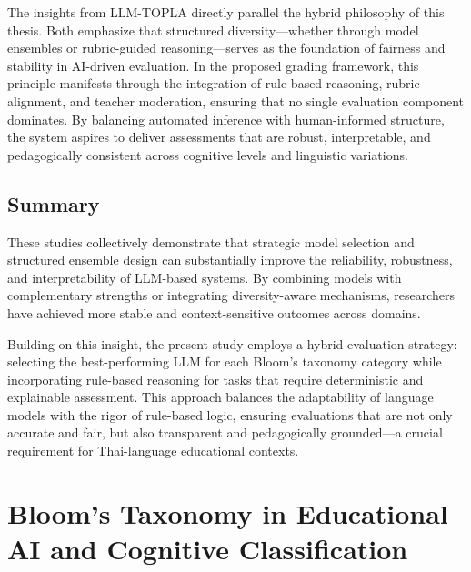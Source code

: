 The insights from LLM-TOPLA directly parallel the hybrid 
philosophy of this thesis. Both emphasize that structured 
diversity—whether through model ensembles or rubric-guided 
reasoning—serves as the foundation of fairness and stability 
in AI-driven evaluation. In the proposed grading framework, 
this principle manifests through the integration of rule-based 
reasoning, rubric alignment, and teacher moderation, ensuring 
that no single evaluation component dominates. By balancing 
automated inference with human-informed structure, the system 
aspires to deliver assessments that are robust, interpretable, 
and pedagogically consistent across cognitive levels and 
linguistic variations.


\subsection{Summary}

These studies collectively demonstrate that strategic model 
selection and structured ensemble design can substantially 
improve the reliability, robustness, and interpretability of 
LLM-based systems. By combining models with complementary 
strengths or integrating diversity-aware mechanisms, 
researchers have achieved more stable and context-sensitive 
outcomes across domains.

Building on this insight, the present study employs a hybrid 
evaluation strategy: selecting the best-performing LLM for 
each Bloom’s taxonomy category while incorporating rule-based 
reasoning for tasks that require deterministic and explainable 
assessment. This approach balances the adaptability of language 
models with the rigor of rule-based logic, ensuring evaluations 
that are not only accurate and fair, but also transparent and 
pedagogically grounded—a crucial requirement for Thai-language 
educational contexts.


\section{Bloom’s Taxonomy in Educational AI and Cognitive Classification}

